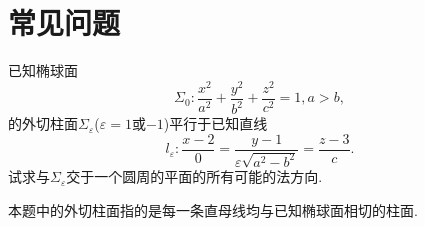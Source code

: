 \documentclass[../../main.tex]{subfiles}%
\begin{document}
\section{常见问题}

\begin{example}
已知椭球面
$$
\Sigma_0:\frac{x^2}{a^2}+\frac{y^2}{b^2}+\frac{z^2}{c^2}=1,a>b,$$
的外切柱面$\Sigma_\varepsilon$($\varepsilon=1$或$-1$)平行于已知直线
$$
l_\varepsilon:\frac{x-2}{0}=\frac{y-1}{\varepsilon\sqrt{a^2-b^2}}=\frac{z-3}{c}.
$$
试求与$\Sigma_\varepsilon$交于一个圆周的平面的所有可能的法方向.
\end{example}
\begin{remark}
本题中的外切柱面指的是每一条直母线均与已知椭球面相切的柱面.
\end{remark}
\begin{solution}


\end{solution}
\end{document}
